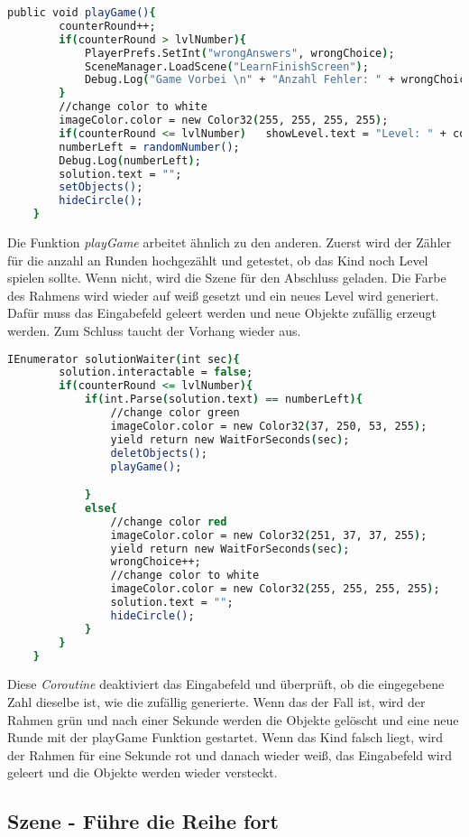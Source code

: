 \begin{lstlisting}[language=csh, caption={hideCircle.cs playGame-Funktion}]
	public void playGame(){
		counterRound++;
		if(counterRound > lvlNumber){
			PlayerPrefs.SetInt("wrongAnswers", wrongChoice);
			SceneManager.LoadScene("LearnFinishScreen");
			Debug.Log("Game Vorbei \n" + "Anzahl Fehler: " + wrongChoice);
		}
		//change color to white
		imageColor.color = new Color32(255, 255, 255, 255);
		if(counterRound <= lvlNumber)	showLevel.text = "Level: " + counterRound + "/" + lvlNumber;
		numberLeft = randomNumber();
		Debug.Log(numberLeft);
		solution.text = "";
		setObjects();
		hideCircle();
	}
\end{lstlisting}
Die Funktion \textit{playGame} arbeitet ähnlich zu den anderen. Zuerst wird der Zähler für die anzahl an Runden hochgezählt und getestet, ob das Kind noch Level spielen sollte. Wenn nicht, wird die Szene für den Abschluss geladen. Die Farbe des Rahmens wird wieder auf weiß gesetzt und ein neues Level wird generiert. Dafür muss das Eingabefeld geleert werden und neue Objekte zufällig erzeugt werden. Zum Schluss taucht der Vorhang wieder aus.\\
\begin{lstlisting}[language=csh, caption={hideCircle.cs solutionWaiter-Funktion}]
	IEnumerator solutionWaiter(int sec){
		solution.interactable = false;
		if(counterRound <= lvlNumber){
			if(int.Parse(solution.text) == numberLeft){
				//change color green
				imageColor.color = new Color32(37, 250, 53, 255);
				yield return new WaitForSeconds(sec);
				deletObjects();
				playGame();

			}
			else{
				//change color red
				imageColor.color = new Color32(251, 37, 37, 255);
				yield return new WaitForSeconds(sec);
				wrongChoice++;
				//change color to white
				imageColor.color = new Color32(255, 255, 255, 255);
				solution.text = "";
				hideCircle();
			}
		}
	}
\end{lstlisting}
Diese \textit{Coroutine} deaktiviert das Eingabefeld und überprüft, ob die eingegebene Zahl dieselbe ist, wie die zufällig generierte. Wenn das der Fall ist, wird der Rahmen grün und nach einer Sekunde werden die Objekte gelöscht und eine neue Runde mit der playGame Funktion gestartet. Wenn das Kind falsch liegt, wird der Rahmen für eine Sekunde rot und danach wieder weiß, das Eingabefeld wird geleert und die Objekte werden wieder versteckt.
\subsection{Szene - Führe die Reihe fort}
